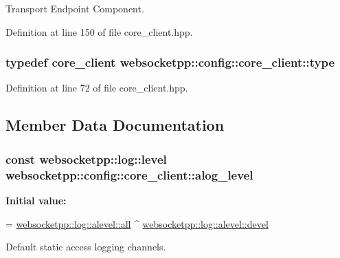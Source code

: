 Transport Endpoint Component. 



Definition at line 150 of file core\+\_\+client.\+hpp.

\hypertarget{structwebsocketpp_1_1config_1_1core__client_a0d7afa0193a253a7afa8b8f3cc914019}{}
\subsubsection[{type}]{\setlength{\rightskip}{0pt plus 5cm}typedef {\bf core\+\_\+client} {\bf websocketpp\+::config\+::core\+\_\+client\+::type}}\label{structwebsocketpp_1_1config_1_1core__client_a0d7afa0193a253a7afa8b8f3cc914019}


Definition at line 72 of file core\+\_\+client.\+hpp.



\subsection{Member Data Documentation}
\hypertarget{structwebsocketpp_1_1config_1_1core__client_a286f74bd1d4f4a7c363866ef92284992}{}
\subsubsection[{alog\+\_\+level}]{\setlength{\rightskip}{0pt plus 5cm}const {\bf websocketpp\+::log\+::level} websocketpp\+::config\+::core\+\_\+client\+::alog\+\_\+level\hspace{0.3cm}{\ttfamily [static]}}\label{structwebsocketpp_1_1config_1_1core__client_a286f74bd1d4f4a7c363866ef92284992}
{\bfseries Initial value\+:}
\begin{DoxyCode}
=
        \hyperlink{structwebsocketpp_1_1log_1_1alevel_a853aa0b8976e53f3181af3bc398d493e}{websocketpp::log::alevel::all} ^ 
      \hyperlink{structwebsocketpp_1_1log_1_1alevel_a65ec21c75999c993c25c72569018f576}{websocketpp::log::alevel::devel}
\end{DoxyCode}


Default static access logging channels. 

